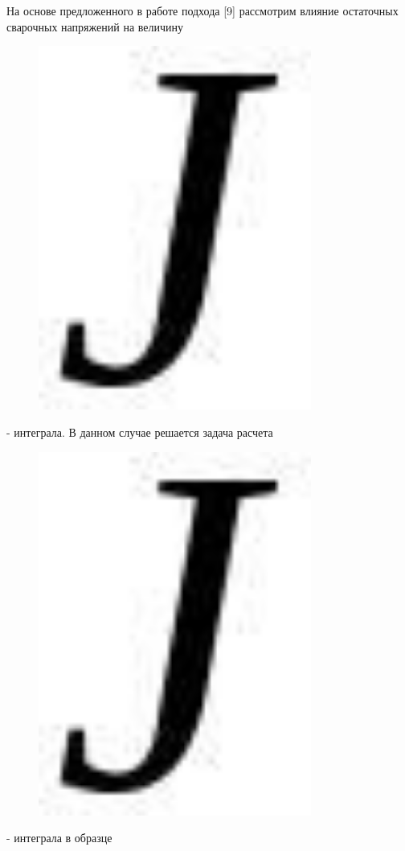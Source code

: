 На основе предложенного в работе подхода {[}9{]} рассмотрим влияние
остаточных сварочных напряжений на величину
\begin{figure}[H]
	\centering
	\includegraphics[width=0.8\textwidth]{assets/1212}
	\caption*{}
\end{figure}- интеграла. В данном случае решается
задача расчета \begin{figure}[H]
	\centering
	\includegraphics[width=0.8\textwidth]{assets/1213}
	\caption*{}
\end{figure}- интеграла в образце
